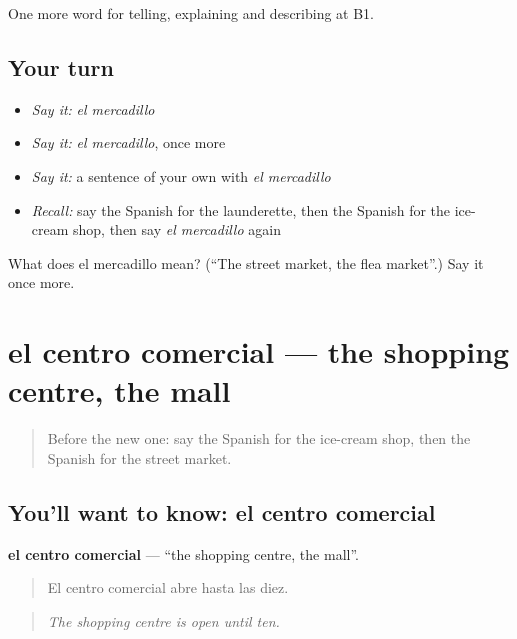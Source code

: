 \begin{grammarlens}[title={What you've built}]
One more word for telling, explaining and describing at B1.
\end{grammarlens}

\subsection*{Your turn}
\begin{itemize}
\raggedright
  \item \emph{Say it:} \emph{el mercadillo}
  \item \emph{Say it:} \emph{el mercadillo}, once more
  \item \emph{Say it:} a sentence of your own with \emph{el mercadillo}
  \item \emph{Recall:} say the Spanish for the launderette, then the Spanish for the ice-cream shop, then say \emph{el mercadillo} again
\end{itemize}

\begin{tcolorbox}[breakable,colback=teal!4,colframe=teal!35!black,title={Before you move on}]
What does el mercadillo mean? (\textquotedblleft{}The street market, the flea market\textquotedblright{}.) Say it once more.
\end{tcolorbox}
\section[el centro comercial]{el centro comercial — the shopping centre, the mall}

\label{lesson:ES-C681-centro-comercial}



\begin{quote}
Before the new one: say the Spanish for the ice-cream shop, then the Spanish for the street market.
\end{quote}

\subsection*{You'll want to know: el centro comercial}
\textbf{el centro comercial} — \textquotedblleft{}the shopping centre, the mall\textquotedblright{}.

\begin{quote}
El centro comercial abre hasta las diez.
\end{quote}

\begin{quote}
\emph{The shopping centre is open until ten.}
\end{quote}

